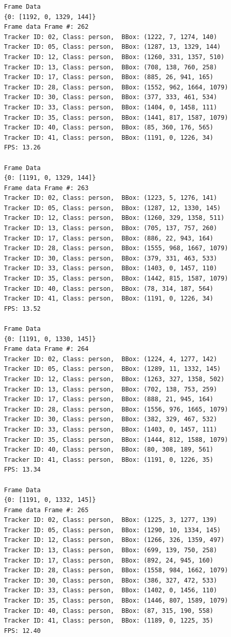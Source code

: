 \documentclass{fisatprojectfinal}
\begin{document}
\begin{verbatim}
    Frame Data
    {0: [1192, 0, 1329, 144]}
    Frame data Frame #: 262
    Tracker ID: 02, Class: person,  BBox: (1222, 7, 1274, 140)
    Tracker ID: 05, Class: person,  BBox: (1287, 13, 1329, 144)
    Tracker ID: 12, Class: person,  BBox: (1260, 331, 1357, 510)
    Tracker ID: 13, Class: person,  BBox: (708, 138, 760, 258)
    Tracker ID: 17, Class: person,  BBox: (885, 26, 941, 165)
    Tracker ID: 28, Class: person,  BBox: (1552, 962, 1664, 1079)
    Tracker ID: 30, Class: person,  BBox: (377, 333, 461, 534)
    Tracker ID: 33, Class: person,  BBox: (1404, 0, 1458, 111)
    Tracker ID: 35, Class: person,  BBox: (1441, 817, 1587, 1079)
    Tracker ID: 40, Class: person,  BBox: (85, 360, 176, 565)
    Tracker ID: 41, Class: person,  BBox: (1191, 0, 1226, 34)
    FPS: 13.26
    
    Frame Data
    {0: [1191, 0, 1329, 144]}
    Frame data Frame #: 263
    Tracker ID: 02, Class: person,  BBox: (1223, 5, 1276, 141)
    Tracker ID: 05, Class: person,  BBox: (1287, 12, 1330, 145)
    Tracker ID: 12, Class: person,  BBox: (1260, 329, 1358, 511)
    Tracker ID: 13, Class: person,  BBox: (705, 137, 757, 260)
    Tracker ID: 17, Class: person,  BBox: (886, 22, 943, 164)
    Tracker ID: 28, Class: person,  BBox: (1555, 968, 1667, 1079)
    Tracker ID: 30, Class: person,  BBox: (379, 331, 463, 533)
    Tracker ID: 33, Class: person,  BBox: (1403, 0, 1457, 110)
    Tracker ID: 35, Class: person,  BBox: (1442, 815, 1587, 1079)
    Tracker ID: 40, Class: person,  BBox: (78, 314, 187, 564)
    Tracker ID: 41, Class: person,  BBox: (1191, 0, 1226, 34)
    FPS: 13.52
    
    Frame Data
    {0: [1191, 0, 1330, 145]}
    Frame data Frame #: 264
    Tracker ID: 02, Class: person,  BBox: (1224, 4, 1277, 142)
    Tracker ID: 05, Class: person,  BBox: (1289, 11, 1332, 145)
    Tracker ID: 12, Class: person,  BBox: (1263, 327, 1358, 502)
    Tracker ID: 13, Class: person,  BBox: (702, 138, 753, 259)
    Tracker ID: 17, Class: person,  BBox: (888, 21, 945, 164)
    Tracker ID: 28, Class: person,  BBox: (1556, 976, 1665, 1079)
    Tracker ID: 30, Class: person,  BBox: (382, 329, 467, 532)
    Tracker ID: 33, Class: person,  BBox: (1403, 0, 1457, 111)
    Tracker ID: 35, Class: person,  BBox: (1444, 812, 1588, 1079)
    Tracker ID: 40, Class: person,  BBox: (80, 308, 189, 561)
    Tracker ID: 41, Class: person,  BBox: (1191, 0, 1226, 35)
    FPS: 13.34
    
    Frame Data
    {0: [1191, 0, 1332, 145]}
    Frame data Frame #: 265
    Tracker ID: 02, Class: person,  BBox: (1225, 3, 1277, 139)
    Tracker ID: 05, Class: person,  BBox: (1290, 10, 1334, 145)
    Tracker ID: 12, Class: person,  BBox: (1266, 326, 1359, 497)
    Tracker ID: 13, Class: person,  BBox: (699, 139, 750, 258)
    Tracker ID: 17, Class: person,  BBox: (892, 24, 945, 160)
    Tracker ID: 28, Class: person,  BBox: (1558, 984, 1662, 1079)
    Tracker ID: 30, Class: person,  BBox: (386, 327, 472, 533)
    Tracker ID: 33, Class: person,  BBox: (1402, 0, 1456, 110)
    Tracker ID: 35, Class: person,  BBox: (1446, 807, 1589, 1079)
    Tracker ID: 40, Class: person,  BBox: (87, 315, 190, 558)
    Tracker ID: 41, Class: person,  BBox: (1189, 0, 1225, 35)
    FPS: 12.40
    

\end{verbatim}
\end{document}
